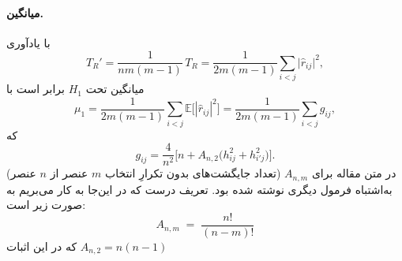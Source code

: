 \begin{اثبات}
	
	
	\paragraph{میانگین.}
	با یادآوری
	\[
	T_{R}'=\frac{1}{nm(m-1)}\,T_{R}
	=\frac{1}{2m(m-1)}\sum_{i<j}\big|\hat r_{ij}\big|^{2},
	\]
	میانگین تحت \(H_{1}\) برابر است با
	\begin{equation}
		\mu_{1}
		=\frac{1}{2m(m-1)}\sum_{i<j}\mathbb{E}\!\big[|\hat r_{ij}|^{2}\big]
		=\frac{1}{2m(m-1)}\sum_{i<j} g_{ij},
	\end{equation}
	که
	\begin{equation}
		g_{ij}
		=\frac{4}{n^{2}}\Big[n+A_{n,2}\big(h_{ij}^{2}+h_{i'j}^{2}\big)\Big].
	\end{equation}
	\textit{\color{BrickRed}{تذکر (تصحیح):}}
	در متن مقاله برای \(A_{n,m}\) (تعداد جایگشت‌های بدون تکرارِ انتخاب \(m\) عنصر از \(n\) عنصر) به‌اشتباه فرمول دیگری نوشته شده بود. تعریف درست که در این‌جا به کار می‌بریم به صورت زیر است‌:
	$$
	A_{n,m}\;=\;\frac{n!}{(n-m)!}
	$$
	که در این اثبات 
	$A_{n,2}=n(n-1)$
	

\end{اثبات}
